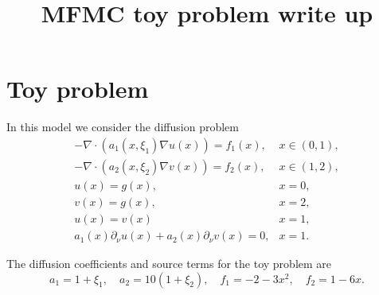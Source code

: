 \documentclass[final,3p,times,11pt]{article}
\title{ \textbf{MFMC toy problem write up}}
\date{}
\begin{document}
\maketitle
\vspace{-2.3cm}

\section{Toy problem}
In this model we consider the diffusion problem
\begin{equation}
\label{eq: Model2_1}
\begin{array}{lll}
-\nabla \cdot (a_1(x,\xi_1) \nabla u(x)) = f_1(x), & x \in  (0,1),\\
-\nabla \cdot (a_2(x,\xi_2)\nabla v(x)) = f_2(x), & x \in  (1,2),\\
  u(x) = g(x), & x = 0,\\
  v(x) = g(x), & x = 2,\\
  u(x) = v(x) & x = 1,\\
a_1(x)\partial_\nu u(x) + a_2(x) \partial_\nu v(x) = 0, & x = 1.
\end{array}
\end{equation}

The diffusion coefficients and source terms for the toy problem are
\[
a_1=1+\xi_1,\quad a_2 = 10(1+\xi_2),\quad f_1 = -2-3x^2,\quad f_2 = 1-6x.
\]
\end{document}
